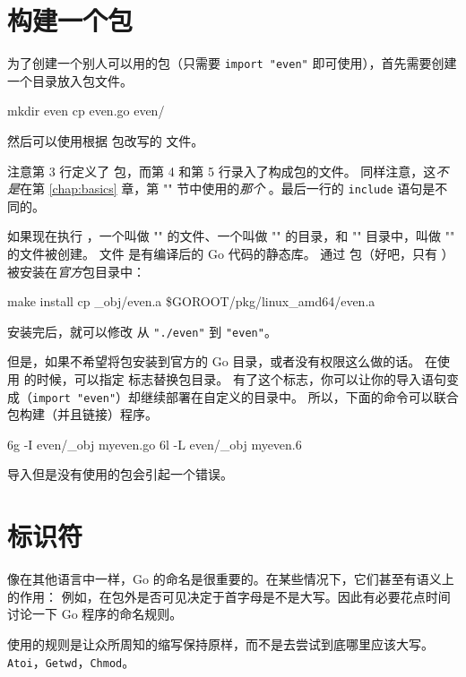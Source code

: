 \section{构建一个包}
\label{sec:building a package}
为了创建一个别人可以用的包（只需要 \lstinline{import "even"} 即可使用），首先需要创建一个目录放入包文件。
\begin{display}
\pr mkdir even
\pr cp even.go even/
\end{display}
\noindent{}然后可以使用根据  包改写的  文件。

注意第 3 行定义了  包，而第 4 和第 5 行录入了构成包的文件。
同样注意，这\emph{不是}在第 \ref{chap:basics} 章，第 ""
节中使用的\emph{那个} 。最后一行的 \verb|include| 语句是不同的。

如果现在执行 ，一个叫做 "" 的文件、一个叫做
"" 的目录，和 "" 目录中，叫做 "" 的文件被创建。
文件  是有编译后的 Go 代码的静态库。
通过  包（好吧，只有 ）被安装在\emph{官方}包目录中：
\begin{display}
\pr make install
cp \_obj/even.a \$GOROOT/pkg/linux\_amd64/even.a
\end{display}
\noindent{}安装完后，就可以修改  从
\lstinline{"./even"} 到 \lstinline{"even"}。

但是，如果不希望将包安装到官方的 Go 目录，或者没有权限这么做的话。
在使用  的时候，可以指定  标志替换包目录。
有了这个标志，你可以让你的导入语句变成（\lstinline{import "even"}）却继续部署在自定义的目录中。
所以，下面的命令可以联合包构建（并且链接）程序。
\begin{display}
\pr 6g -I even/\_obj myeven.go	
\pr 6l -L even/\_obj myeven.6	
\end{display}

\noindent{}导入但是没有使用的包会引起一个错误。

\section{标识符}
像在其他语言中一样，Go 的命名是很重要的。在某些情况下，它们甚至有语义上的作用：
例如，在包外是否可见决定于首字母是不是大写。因此有必要花点时间讨论一下 Go 程序的命名规则。

使用的规则是让众所周知的缩写保持原样，而不是去尝试到底哪里应该大写。
\lstinline{Atoi}，\lstinline{Getwd}，\lstinline{Chmod}。

